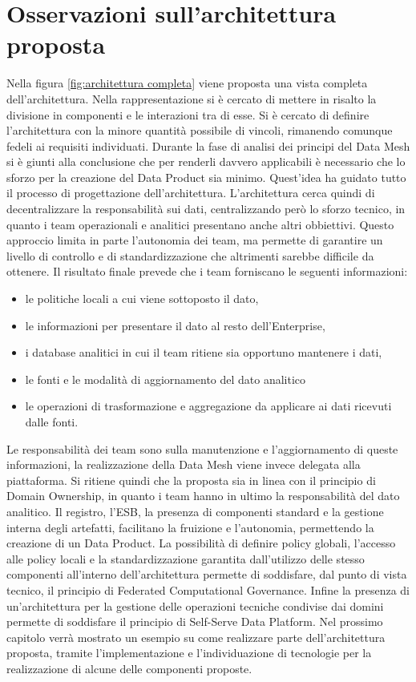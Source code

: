 \documentclass[12pt]{report}
\begin{document}
\section{Osservazioni sull'architettura proposta}
Nella figura \ref{fig:architettura completa} viene proposta una vista completa dell'architettura.
Nella rappresentazione si è cercato di mettere in risalto la divisione in componenti e le interazioni tra di esse.
Si è cercato di definire l'architettura con la minore quantità possibile di vincoli, rimanendo comunque fedeli ai requisiti individuati.
Durante la fase di analisi dei principi del Data Mesh si è giunti alla conclusione che per renderli davvero applicabili è necessario che lo sforzo per la creazione del Data Product sia minimo.
Quest'idea ha guidato tutto il processo di progettazione dell'architettura.
L'architettura cerca quindi di decentralizzare la responsabilità sui dati, centralizzando però lo sforzo tecnico, in quanto i team operazionali e analitici presentano anche altri obbiettivi.
Questo approccio limita in parte l'autonomia dei team, ma permette di garantire un livello di controllo e di standardizzazione che altrimenti sarebbe difficile da ottenere.
Il risultato finale prevede che i team forniscano le seguenti informazioni:
\begin{itemize}
    \item le politiche locali a cui viene sottoposto il dato,
    \item le informazioni per presentare il dato al resto dell'Enterprise,
    \item i database analitici in cui il team ritiene sia opportuno mantenere i dati,
    \item le fonti e le modalità di aggiornamento del dato analitico
    \item le operazioni di trasformazione e aggregazione da applicare ai dati ricevuti dalle fonti.
\end{itemize}
Le responsabilità dei team sono sulla manutenzione e l'aggiornamento di queste informazioni, la realizzazione della Data Mesh viene invece delegata alla piattaforma.
Si ritiene quindi che la proposta sia in linea con il principio di Domain Ownership, in quanto i team hanno in ultimo la responsabilità del dato analitico.
Il registro, l'ESB, la presenza di componenti standard e la gestione interna degli artefatti, facilitano la fruizione e l'autonomia, permettendo la creazione di un Data Product.
La possibilità di definire policy globali, l'accesso alle policy locali e la standardizzazione garantita dall'utilizzo delle stesso componenti all'interno dell'architettura permette di soddisfare, dal punto di vista tecnico, il principio di Federated Computational Governance.
Infine la presenza di un'architettura per la gestione delle operazioni tecniche condivise dai domini permette di soddisfare il principio di Self-Serve Data Platform.
Nel prossimo capitolo verrà mostrato un esempio su come realizzare parte dell'architettura proposta, tramite l'implementazione e l'individuazione di tecnologie per la realizzazione di alcune delle componenti proposte.
\end{document}

